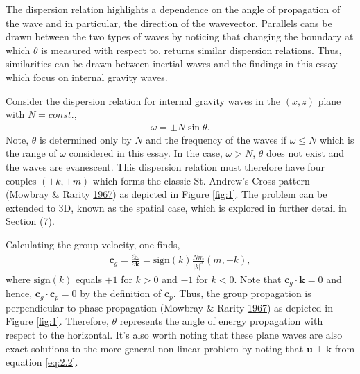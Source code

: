 \documentclass[a4paper]{article}
\numberwithin{equation}{section}
\begin{document}
The dispersion relation highlights a dependence on the angle of propagation of the wave and in particular, the direction of the wavevector. Parallels cans be drawn between the two types of waves by noticing that changing the boundary at which $\theta$ is measured with respect to, returns similar dispersion relations. Thus, similarities can be drawn between inertial waves and the findings in this essay which focus on internal gravity waves.

Consider the dispersion relation for internal gravity waves in the $(x,z)$ plane with $N = const.$,
\begin{align}\label{eq:2.5}
\omega = \pm N \sin \theta.
\end{align}
Note, $\theta$ is determined only by $N$ and the frequency of the waves if $\omega \leq N$ which is the range of $\omega$ considered in this essay. In the case, $\omega > N$, $\theta$ does not exist and the waves are evanescent. This dispersion relation must therefore have four couples $(\pm k, \pm m)$ which forms the classic St. Andrew's Cross pattern (Mowbray \& Rarity \hyperlink{ref 5}{1967}) as depicted in Figure \ref{fig:1}. The problem can be extended to 3D, known as the spatial case, which is explored in further detail in Section (\hyperref[sec:7]{7}).

Calculating the group velocity, one finds, 
\begin{align}\label{eq:2.6}
\mathbf{c}_g = \frac{\partial \omega}{\partial \mathbf{k}} =  \text{sign}(k) \frac{Nm}{|k|^3}(m, - k),
\end{align}
where $\text{sign}(k)$ equals $+1$ for $k > 0$ and $-1$ for $k<0$. Note that $\mathbf{c}_g \cdot \mathbf{k} = 0$ and hence, $\mathbf{c}_g \cdot \mathbf{c}_p = 0$ by the definition of $\mathbf{c}_p$. Thus, the group propagation is perpendicular to phase propagation (Mowbray \& Rarity \hyperlink{ref 5}{1967}) as depicted in Figure \ref{fig:1}. Therefore, $\theta$ represents the angle of energy propagation with respect to the horizontal. It's also worth noting that these plane waves are also exact solutions to the more general non-linear problem by noting that $\mathbf{u} \perp \mathbf{k}$ from equation \eqref{eq:2.2}.
\end{document}
